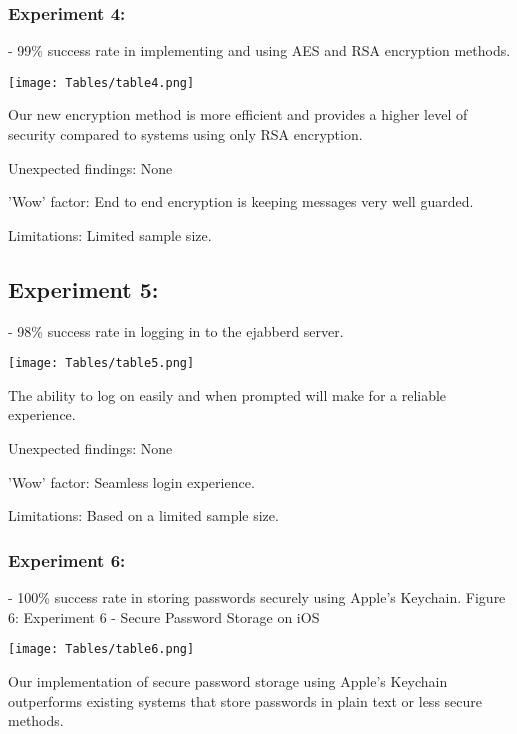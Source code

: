 \documentclass[12pt]{article}
\begin{document}
\subsubsection{Experiment 4:}

- 99\% success rate in implementing and using AES and RSA encryption methods.

\begin{center}
\texttt{[image: Tables/table4.png]}
\end{center}

Our new encryption method is more efficient and provides a higher level of security compared to systems using only RSA encryption.

Unexpected findings: None

'Wow' factor: End to end encryption is keeping messages very well guarded.

Limitations: Limited sample size.

\subsection{Experiment 5:}

- 98\% success rate in logging in to the ejabberd server.  

\begin{center}
\texttt{[image: Tables/table5.png]}
\end{center}

The ability to log on easily and when prompted will make for a reliable experience.

Unexpected findings: None

'Wow' factor: Seamless login experience.

Limitations: Based on a limited sample size.

\subsubsection{Experiment 6:}
- 100\% success rate in storing passwords securely using Apple's Keychain.\newline
Figure 6: Experiment 6 - Secure Password Storage on iOS
 
\begin{center}
\texttt{[image: Tables/table6.png]}
\end{center}

Our implementation of secure password storage using Apple's Keychain outperforms existing systems that store passwords in plain text or less secure methods.
\end{document}
